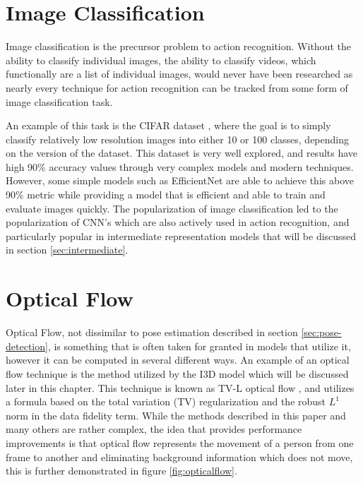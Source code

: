 \section{Image Classification}

Image classification is the precursor problem to action recognition. Without the ability to classify individual images, the ability to classify videos, which functionally are a list of individual images, would never have been researched as nearly every technique for action recognition can be tracked from some form of image classification task.

An example of this task is the CIFAR dataset \cite{cifar}, where the goal is to simply classify relatively low resolution images into either 10 or 100 classes, depending on the version of the dataset. This dataset is very well explored, and results have high 90\% accuracy values through very complex models and modern techniques. However, some simple models such as EfficientNet \cite{efficientnet} are able to achieve this above 90\% metric while providing a model that is efficient and able to train and evaluate images quickly. The popularization of image classification led to the popularization of CNN's which are also actively used in action recognition, and particularly popular in intermediate representation models that will be discussed in section \ref{sec:intermediate}.

\section{Optical Flow}

Optical Flow, not dissimilar to pose estimation described in section \ref{sec:pose-detection}, is something that is often taken for granted in models that utilize it, however it can be computed in several different ways. An example of an optical flow technique is the method utilized by the I3D model \cite{i3d} which will be discussed later in this chapter. This technique is known as TV-L optical flow \cite{TV-L}, and utilizes a formula based on the total variation (TV) regularization and the robust $L^1$ norm in the data fidelity term. While the methods described in this paper and many others are rather complex, the idea that provides performance improvements is that optical flow represents the movement of a person from one frame to another and eliminating background information which does not move, this is further demonstrated in figure \ref{fig:opticalflow}.

